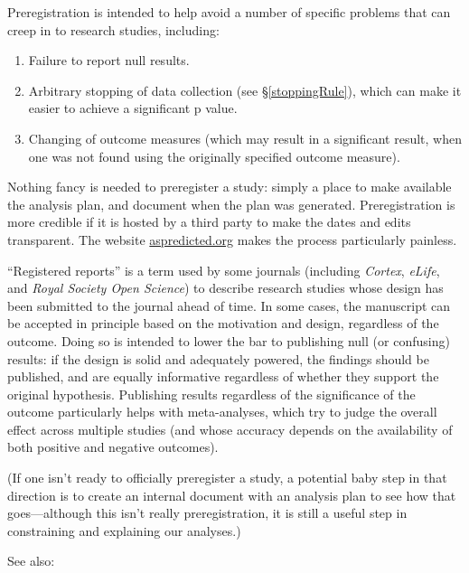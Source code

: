 \documentclass[letterpaper,oneside,11pt,article, portrait]{memoir}
\newcommand{\journal}[1]{\textit{#1}} 			%
\begin{document}
Preregistration is intended to help avoid a number of specific problems that can creep in to research studies, including:

\begin{enumerate}
\item Failure to report null results.
\item Arbitrary stopping of data collection (see \S \ref{stoppingRule}), which can make it easier to achieve a significant p value.
\item Changing of outcome measures (which may result in a significant result, when one was not found using the originally specified outcome measure).
\end{enumerate}

Nothing fancy is needed to preregister a study: simply a place to make available the analysis plan, and document when the plan was generated. Preregistration is more credible if it is hosted by a third party to make the dates and edits transparent. The website \href{http://aspredicted.org}{aspredicted.org} makes the process particularly painless.

``Registered reports'' is a term used by some journals (including \journal{Cortex}, \journal{eLife}, and \journal{Royal Society Open Science}) to describe research studies whose design has been submitted to the journal ahead of time. In some cases, the manuscript can be accepted in principle based on the motivation and design, regardless of the outcome. Doing so is intended to lower the bar to publishing null (or confusing) results: if the design is solid and adequately powered, the findings should be published, and are equally informative regardless of whether they support the original hypothesis. Publishing results regardless of the significance of the outcome particularly helps with meta-analyses, which try to judge the overall effect across multiple studies (and whose accuracy depends on the availability of both positive and negative outcomes).

(If one isn't ready to officially preregister a study, a potential baby step in that direction is to create an internal document with an analysis plan to see how that goes---although this isn't really preregistration, it is still a useful step in constraining and explaining our analyses.)

\vspace{1em} \noindent See also:
\end{document}
